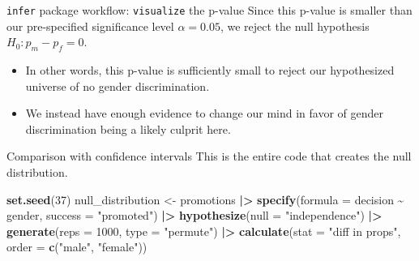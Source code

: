 \documentclass[
  ignorenonframetext,
]{beamer}
\newenvironment{Shaded}{\begin{snugshade}}{\end{snugshade}}
\newcommand{\AttributeTok}[1]{\textcolor[rgb]{0.13,0.29,0.53}{#1}}
\newcommand{\DecValTok}[1]{\textcolor[rgb]{0.00,0.00,0.81}{#1}}
\newcommand{\FunctionTok}[1]{\textcolor[rgb]{0.13,0.29,0.53}{\textbf{#1}}}
\newcommand{\NormalTok}[1]{#1}
\newcommand{\OtherTok}[1]{\textcolor[rgb]{0.56,0.35,0.01}{#1}}
\newcommand{\SpecialCharTok}[1]{\textcolor[rgb]{0.81,0.36,0.00}{\textbf{#1}}}
\newcommand{\StringTok}[1]{\textcolor[rgb]{0.31,0.60,0.02}{#1}}
\begin{document}
\begin{frame}{\texttt{infer} package workflow: \texttt{visualize} the
p-value}
\label{infer-package-workflow-visualize-the-p-value-2}
Since this p-value is smaller than our pre-specified significance level
\(\alpha=0.05\), we reject the null hypothesis \(H_0: p_m-p_f=0\).

\begin{itemize}
\item
  In other words, this p-value is sufficiently small to reject our
  hypothesized universe of no gender discrimination.
\item
  We instead have enough evidence to change our mind in favor of gender
  discrimination being a likely culprit here.
\end{itemize}
\end{frame}

\begin{frame}[fragile]{Comparison with confidence intervals}
\label{comparison-with-confidence-intervals}
This is the entire code that creates the null distribution.

\begin{Shaded}
\begin{Highlighting}[]
\FunctionTok{set.seed}\NormalTok{(}\DecValTok{37}\NormalTok{)}
\NormalTok{null\_distribution }\OtherTok{\textless{}{-}}\NormalTok{ promotions }\SpecialCharTok{|\textgreater{}} 
  \FunctionTok{specify}\NormalTok{(}\AttributeTok{formula =}\NormalTok{ decision }\SpecialCharTok{\textasciitilde{}}\NormalTok{ gender, }
          \AttributeTok{success =} \StringTok{"promoted"}\NormalTok{) }\SpecialCharTok{|\textgreater{}} 
  \FunctionTok{hypothesize}\NormalTok{(}\AttributeTok{null =} \StringTok{"independence"}\NormalTok{) }\SpecialCharTok{|\textgreater{}} 
  \FunctionTok{generate}\NormalTok{(}\AttributeTok{reps =} \DecValTok{1000}\NormalTok{, }\AttributeTok{type =} \StringTok{"permute"}\NormalTok{) }\SpecialCharTok{|\textgreater{}} 
  \FunctionTok{calculate}\NormalTok{(}\AttributeTok{stat =} \StringTok{"diff in props"}\NormalTok{, }
            \AttributeTok{order =} \FunctionTok{c}\NormalTok{(}\StringTok{"male"}\NormalTok{, }\StringTok{"female"}\NormalTok{))}
\end{Highlighting}
\end{Shaded}
\end{frame}
\end{document}
